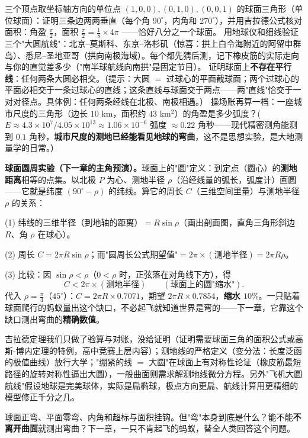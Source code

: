 \begin{dongshou}
\begin{itemize}
  \yisi 三个顶点取坐标轴方向的单位点 $(1,0,0), (0,1,0), (0,0,1)$ 的球面三角形（单位球面）：证明三条边两两垂直（每个角 $90^\circ$，内角和 $270^\circ$），并用吉拉德公式核对面积：角盈 $\tfrac\pi2$，面积 $\tfrac\pi2 = \tfrac18\times4\pi$ \checkmark——恰好八分之一个球面。
  \yier 用地球仪和细线验证三个"大圆航线"：北京--莫斯科、东京--洛杉矶（惊喜：拱上白令海附近的阿留申群岛）、悉尼--圣地亚哥（拱向南极海域）。每个都先猜后测，记下橡皮筋的实际走向与你的直觉差多少（"南半球航线向南拱"是固定节目）。
  \yier 证明球面上\textbf{不存在平行线}：任何两条大圆必相交。（提示：大圆 $=$ 过球心的平面截球面；两个过球心的平面必相交于一条过球心的直线；这条直线与球面交于两点——两"直线"恰交于一对对径点。具体例：任何两条经线在北极、南极相遇。）
  \yier 操场账再算一档：一座城市尺度的三角形（边长 $10$ km，面积约 $43$ km$^2$）的角盈是多少弧度？($E \approx 4.3\times10^7/4.05\times10^{13} \approx 1.06\times10^{-6}$ 弧度 $\approx 0.22$ 角秒——现代精密测角能测到 $0.1$ 角秒，\textbf{城市尺度的测地已经能看见地球的弯曲}，这不是思想实验，是大地测量学的日常。）
\end{itemize}
\end{dongshou}

\begin{shaonao}
\textbf{球面圆周实验（下一章的主角预演）。}球面上的"圆"定义：到定点（圆心）的\textbf{测地距离}相等的点集。以北极 $P$ 为心、测地半径 $\rho$（沿经线量的弧长，弧度计）画圆——它就是纬度 $\left(90^\circ - \rho\right)$ 的纬线。算它的周长 $C$（三维空间里量）与测地半径 $\rho$ 的关系：

(1) 纬线的三维半径（到地轴的距离）$= R\sin\rho$（画出剖面图，直角三角形斜边 $R$、角 $\rho$ 在球心）。

(2) 周长 $C = 2\pi R\sin\rho$；而"圆周长公式期望值"$= 2\pi\times(\text{测地半径}) = 2\pi R\rho$。

(3) 比较：因 $\sin\rho < \rho$（$0 < \rho$ 时，正弦落在对角线下方），得
\[
\boxed{C < 2\pi\times(\text{测地半径})} \qquad (\text{球面上的圆"缩水"}) .
\]
代入 $\rho = \tfrac\pi4$（$45^\circ$）：$C = 2\pi R\times0.7071$，期望 $2\pi R\times0.7854$，\textbf{缩水 $10\%$}。一只贴着球面爬行的蚂蚁量出这个缺口，不必起飞就知道世界是弯的——下一章，它靠这个缺口测出弯曲的\textbf{精确数值}。
\end{shaonao}

\begin{chengshi}
吉拉德定理我们只做了验算与对账，没给证明（证明需要球面三角的面积公式或高斯-博内定理的特例，高中竞赛上层内容）；测地线的严格定义（变分法：长度泛函的极值曲线）放行大学；"绷紧的线 $=$ 大圆"在球面上有对称性论证（橡皮筋最短路径的旋转对称性逼出大圆），一般曲面则需求解测地线微分方程。另外"飞机大圆航线"假设地球是完美球体，实际是扁椭球，极点方向更扁、航线计算用更精细的模型修正千分之几。
\end{chengshi}

球面正弯、平面零弯、内角和超标与面积挂钩。但"弯"本身到底是什么？能不能\textbf{不离开曲面}就测出弯曲？下一章，一只不肯起飞的蚂蚁，替全人类回答这个问题。
